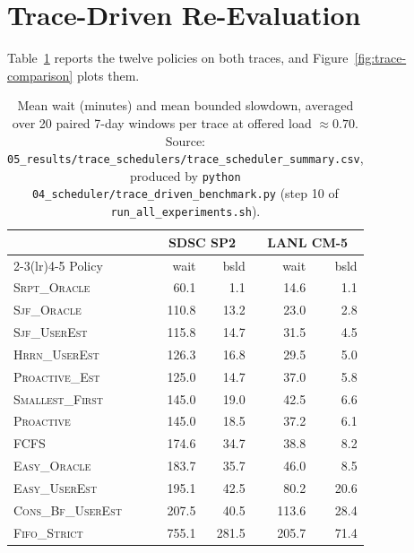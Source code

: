 \documentclass[11pt,twocolumn]{article}
\begin{document}
\section{Trace-Driven Re-Evaluation}
\label{sec:traces}

Table~\ref{tab:traces} reports the twelve policies on both traces, and
Figure~\ref{fig:trace-comparison} plots them.

\begin{table}[h]
\centering
\small
\begin{tabular}{lrrrr}
\toprule
& \multicolumn{2}{c}{SDSC SP2} & \multicolumn{2}{c}{LANL CM-5} \\
\cmidrule(lr){2-3}\cmidrule(lr){4-5}
Policy & wait & bsld & wait & bsld \\
\midrule
\textsc{Srpt\_Oracle}    &  60.1 &   1.1 &  14.6 &  1.1 \\
\textsc{Sjf\_Oracle}     & 110.8 &  13.2 &  23.0 &  2.8 \\
\textsc{Sjf\_UserEst}    & 115.8 &  14.7 &  31.5 &  4.5 \\
\textsc{Hrrn\_UserEst}   & 126.3 &  16.8 &  29.5 &  5.0 \\
\textsc{Proactive\_Est}  & 125.0 &  14.7 &  37.0 &  5.8 \\
\textsc{Smallest\_First} & 145.0 &  19.0 &  42.5 &  6.6 \\
\textsc{Proactive}       & 145.0 &  18.5 &  37.2 &  6.1 \\
\textsc{FCFS}            & 174.6 &  34.7 &  38.8 &  8.2 \\
\textsc{Easy\_Oracle}    & 183.7 &  35.7 &  46.0 &  8.5 \\
\textsc{Easy\_UserEst}   & 195.1 &  42.5 &  80.2 & 20.6 \\
\textsc{Cons\_Bf\_UserEst}& 207.5 &  40.5 & 113.6 & 28.4 \\
\textsc{Fifo\_Strict}    & 755.1 & 281.5 & 205.7 & 71.4 \\
\bottomrule
\end{tabular}
\caption{Mean wait (minutes) and mean bounded slowdown, averaged over 20 paired
7-day windows per trace at offered load $\approx 0.70$.
{\small Source: \texttt{05\_results/trace\_schedulers/trace\_scheduler\_summary.csv},
produced by \texttt{python 04\_scheduler/trace\_driven\_benchmark.py} (step 10
of \texttt{run\_all\_experiments.sh}).}}
\label{tab:traces}
\end{table}
\end{document}
